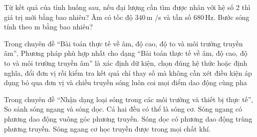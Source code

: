 \begin{ex}
Từ kết quả của tình huống sau, nếu đại lượng cần tìm được nhân với hệ số 2 thì giá trị mới bằng bao nhiêu? Âm có tốc độ $340\,\text{m}$ /s và tần số $680\,\text{Hz}$. Bước sóng tính theo m bằng bao nhiêu?
\end{ex}

\begin{ex}
Trong chuyên đề “Bài toán thực tế về âm, độ cao, độ to và môi trường truyền âm”, Phương pháp phù hợp nhất cho dạng “Bài toán thực tế về âm, độ cao, độ to và môi trường truyền âm” là
\choice
{\True xác định dữ kiện, chọn đúng hệ thức hoặc định nghĩa, đổi đơn vị rồi kiểm tra kết quả}
{chỉ thay số mà không cần xét điều kiện áp dụng}
{bỏ qua đơn vị và chiều truyền sóng}
{luôn coi mọi điểm dao động cùng pha}
\end{ex}

\begin{ex}
Trong chuyên đề “Nhận dạng loại sóng trong các môi trường và thiết bị thực tế”, So sánh sóng ngang và sóng dọc.
\choiceTF
{\True Cả hai đều có thể là sóng cơ.}
{\True Sóng ngang có phương dao động vuông góc phương truyền.}
{\True Sóng dọc có phương dao động trùng phương truyền.}
{Sóng ngang cơ học truyền được trong mọi chất khí.}
\end{ex}

